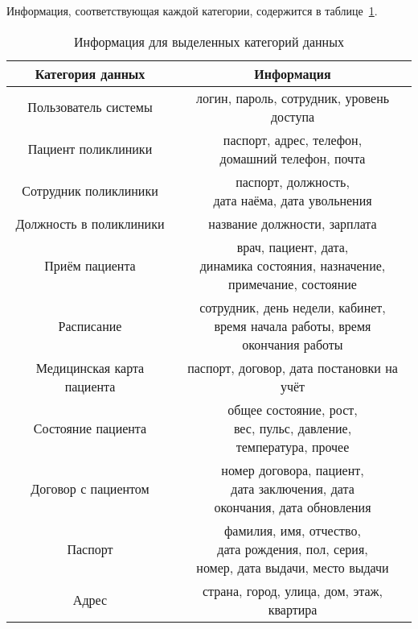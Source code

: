 Информация, соответствующая каждой категории, содержится в таблице~\ref{table:category-info}.

\clearpage

\begin{table}[H]
\begin{center}
	\captionsetup{justification=raggedright,singlelinecheck=off,margin=5mm}
	\caption{Информация для выделенных категорий данных}
	\begin{tabular}{| c | c |}
		\hline
		Категория данных & Информация \\
		\hline
		Пользователь системы & логин, пароль, сотрудник, уровень доступа \\
		\hline
		Пациент поликлиники & \makecell{паспорт, адрес, телефон,\\ домашний телефон, почта}  \\
		\hline
		Сотрудник поликлиники & \makecell{паспорт, должность, \\дата наёма, дата увольнения} \\
		\hline
		Должность в поликлиники & название должности, зарплата \\
		\hline
		Приём пациента & 
\makecell{врач, пациент, дата, \\
	динамика состояния, назначение,\\
	примечание, состояние}\\
		\hline
		Расписание &\makecell{сотрудник, день недели, кабинет, \\
время начала работы, время \\окончания работы}\\
		\hline
		Медицинская карта пациента & паспорт, договор, дата постановки на учёт \\
		\hline
		Состояние пациента & \makecell{общее состояние, рост,\\ вес, пульс, давление, \\температура, прочее }\\
		\hline
		Договор с пациентом & \makecell{номер договора, пациент, \\дата заключения, дата \\окончания, дата обновления} \\
		\hline
		Паспорт & \makecell{фамилия, имя, отчество, \\
дата рождения, пол, серия, \\
номер, дата выдачи, место выдачи} \\
		\hline
		Адрес & страна, город, улица, дом, этаж, квартира \\
		\hline
	\end{tabular}
	\label{table:category-info}
\end{center}
\end{table}

